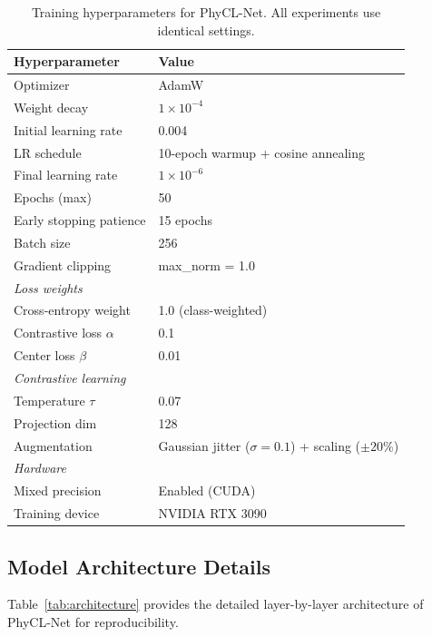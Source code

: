 \documentclass{article}
\begin{document}
\begin{table}[htbp]
\caption{Training hyperparameters for PhyCL-Net. All experiments use identical settings.}
\label{tab:hyperparams}
\centering
\small
\begin{tabular}{ll}
\toprule
\textbf{Hyperparameter} & \textbf{Value} \\
\midrule
Optimizer & AdamW \\
Weight decay & $1 \times 10^{-4}$ \\
Initial learning rate & 0.004 \\
LR schedule & 10-epoch warmup + cosine annealing \\
Final learning rate & $1 \times 10^{-6}$ \\
Epochs (max) & 50 \\
Early stopping patience & 15 epochs \\
Batch size & 256 \\
Gradient clipping & max\_norm = 1.0 \\
\midrule
\multicolumn{2}{l}{\textit{Loss weights}} \\
Cross-entropy weight & 1.0 (class-weighted) \\
Contrastive loss $\alpha$ & 0.1 \\
Center loss $\beta$ & 0.01 \\
\midrule
\multicolumn{2}{l}{\textit{Contrastive learning}} \\
Temperature $\tau$ & 0.07 \\
Projection dim & 128 \\
Augmentation & Gaussian jitter ($\sigma=0.1$) + scaling ($\pm 20\%$) \\
\midrule
\multicolumn{2}{l}{\textit{Hardware}} \\
Mixed precision & Enabled (CUDA) \\
Training device & NVIDIA RTX 3090 \\
\bottomrule
\end{tabular}
\end{table}

\subsection{Model Architecture Details}

Table~\ref{tab:architecture} provides the detailed layer-by-layer architecture of PhyCL-Net for reproducibility.
\end{document}

